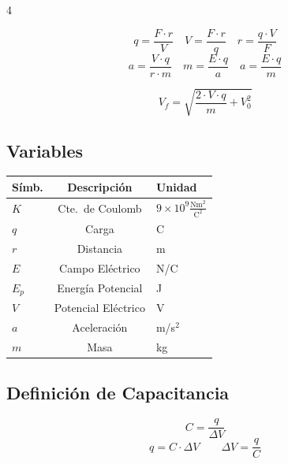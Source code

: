 \documentclass[9pt, landscape, letterpaper]{extarticle}
\begin{document}
\begin{multicols}{4}
  \begin{despejesbox}
    $$q = \frac{F \cdot r}{V} \quad V = \frac{F \cdot r}{q} \quad r = \frac{q \cdot V}{F}$$
    $$a = \frac{V \cdot q}{r \cdot m} \quad m = \frac{E \cdot q}{a} \quad a = \frac{E \cdot q}{m}$$
  \end{despejesbox}

  \begin{formulabox}
    $$V_f = \sqrt{\frac{2 \cdot V \cdot q}{m} + V_0^2}$$
  \end{formulabox}

  \subsection{Variables}

  \begin{tablabox}
    \tablacompacta
    \begin{tabular}{@{}lcl@{}}
      \toprule
      Símb. & Descripción         & Unidad                                         \\
      \midrule
      $K$   & Cte.\ de Coulomb    & $9 \times 10^9 \frac{\text{Nm}^2}{\text{C}^2}$ \\
      $q$   & Carga               & C                                              \\
      $r$   & Distancia           & m                                              \\
      $E$   & Campo Eléctrico     & N/C                                            \\
      $E_p$ & Energía Potencial   & J                                              \\
      $V$   & Potencial Eléctrico & V                                              \\
      $a$   & Aceleración         & m/s$^2$                                        \\
      $m$   & Masa                & kg                                             \\
      \bottomrule
    \end{tabular}
  \end{tablabox}

  \subsection{Definición de Capacitancia}

  \begin{formulabox}
    $$C = \frac{q}{\Delta V}$$
    $$q = C \cdot \Delta V \qquad \Delta V = \frac{q}{C}$$
  \end{formulabox}


\end{multicols}
\end{document}
